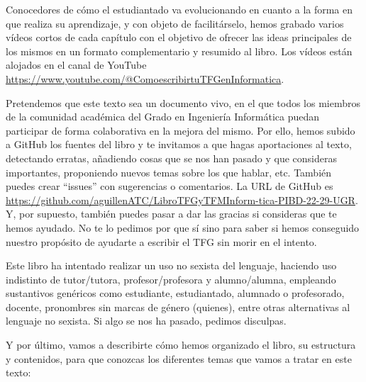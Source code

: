 Conocedores de cómo el estudiantado va evolucionando en cuanto a la forma en que realiza su aprendizaje, y con objeto de facilitárselo, hemos grabado varios vídeos cortos de cada capítulo con el objetivo de ofrecer las ideas principales de los mismos en un formato complementario y resumido al libro. Los vídeos están alojados en el canal de YouTube \url{https://www.youtube.com/@ComoescribirtuTFGenInformatica}.

Pretendemos que este texto sea un documento vivo, en el que todos los miembros de la comunidad académica del Grado en Ingeniería Informática puedan participar de forma colaborativa en la mejora del mismo. Por ello, hemos subido a GitHub los fuentes del libro y te invitamos a que hagas aportaciones al texto, detectando erratas, añadiendo cosas que se nos han pasado y que consideras importantes, proponiendo nuevos temas sobre los que hablar, etc. También puedes crear ``issues'' con sugerencias o comentarios. La URL de GitHub es \url{https://github.com/aguillenATC/LibroTFGyTFMInform-tica-PIBD-22-29-UGR}. Y, por supuesto, también puedes pasar a dar las gracias si consideras que te hemos ayudado. No te lo pedimos por que sí sino para saber si hemos conseguido nuestro propósito de ayudarte a escribir el TFG sin morir en el intento.

Este libro ha intentado realizar un uso no sexista del lenguaje, haciendo uso indistinto de tutor/tutora, profesor/profesora y alumno/alumna, empleando sustantivos genéricos como estudiante, estudiantado, alumnado o profesorado, docente, pronombres sin marcas de género (quienes), entre otras alternativas al lenguaje no sexista. Si algo se nos ha pasado, pedimos disculpas.

Y por último, vamos a describirte cómo hemos organizado el libro, su estructura y contenidos, para que conozcas los diferentes temas que vamos a tratar en este texto:

